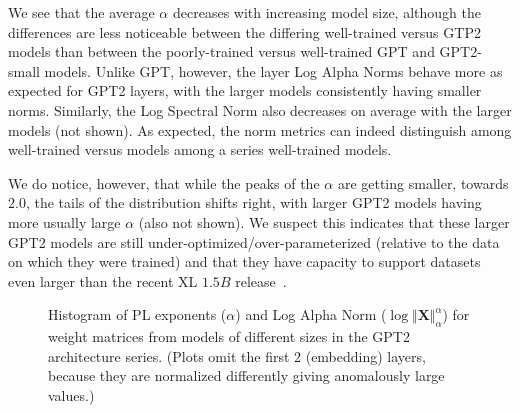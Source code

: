 We see that the average $\alpha$ decreases with increasing model size, although the differences are less noticeable between the differing well-trained 
versus  GTP2 models than between the poorly-trained versus well-trained GPT and GPT2-small models.
Unlike GPT, however, the layer Log Alpha Norms behave more as expected for GPT2 layers, with the larger models consistently having smaller norms. 
Similarly, the Log Spectral Norm also decreases on average with the larger models (not shown).  
As expected, the norm metrics can indeed distinguish among well-trained versus  models among a series well-trained models.

We do notice, however, that while the peaks of the $\alpha$ are getting smaller, towards $2.0$, the tails of the distribution shifts right, with larger GPT2 models having more usually large $\alpha$ (also not shown).  
We suspect this indicates that these larger GPT2 models are still under-optimized/over-parameterized (relative to the data on which they were trained) and that they have capacity to support datasets even larger than the recent XL $1.5B$ release~\cite{gpt2-xl}.

\begin{figure}[htb]
    \centering

    \quad
    \caption{Histogram of PL exponents ($\alpha$)
              and Log Alpha Norm ($\log\Vert\mathbf{X}\Vert_{\alpha}^{\alpha}$) for weight matrices from models of different sizes in the GPT2 architecture series.  (Plots omit the first 2 (embedding) layers, because they are normalized differently giving anomalously large values.)
             }
    \label{fig:gpt2-histograms}
\end{figure}
